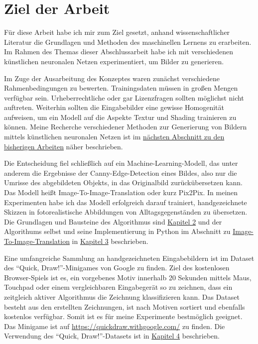 \section{Ziel der Arbeit}
\label{sec:ziel}
Für diese Arbeit habe ich mir zum Ziel gesetzt, anhand wissenschaftlicher Literatur die Grundlagen und Methoden des maschinellen Lernens zu erarbeiten. Im Rahmen des Themas dieser Abschlussarbeit habe ich mit verschiedenen künstlichen neuronalen Netzen experimentiert, um Bilder zu generieren.

Im Zuge der Ausarbeitung des Konzeptes waren zunächst verschiedene Rahmenbedingungen zu bewerten. Trainingsdaten müssen in großen Mengen verfügbar sein. Urheberrechtliche oder gar Lizenzfragen sollten möglichst nicht auftreten. Weiterhin sollten die Eingabebilder eine gewisse Homogenität aufweisen, um ein Modell auf die Aspekte Textur und Shading trainieren zu können. Meine Recherche verschiedener Methoden zur Generierung von Bildern mittels künstlichen neuronalen Netzen ist im \hyperref[sec:related]{nächsten Abschnitt zu den bisherigen Arbeiten} näher beschrieben.

Die Entscheidung fiel schließlich auf ein Machine-Learning-Modell, das unter anderem die Ergebnisse der Canny-Edge-Detection \cite{canny1986edge} eines Bildes, also nur die Umrisse des abgebildeten Objekts, in das Originalbild zurückübersetzen kann. Das Modell heißt Image-To-Image-Translation \cite{isola2018imagetoimage} oder kurz Pix2Pix. In meinen Experimenten habe ich das Modell erfolgreich darauf trainiert, handgezeichnete Skizzen in fotorealistische Abbildungen von Alltagsgegenständen zu übersetzen. Die Grundlagen und Bausteine des Algorithmus sind \hyperref[sec:model]{Kapitel 2} und der Algorithums selbst und seine Implementierung in Python im Abschnitt zu \hyperref[sec:pix2pix]{Image-To-Image-Translation} in \hyperref[ch:impl]{Kapitel 3} beschrieben.

Eine umfangreiche Sammlung an handgezeichneten Eingabebildern ist im Dataset des ``Quick, Draw!''-Minigames von Google zu finden. Ziel des kostenlosen Browser-Spiels ist es, ein vorgebenes Motiv innerhalb 20 Sekunden mittels Maus, Touchpad oder einem vergleichbaren Eingabegerät so zu zeichnen, dass ein zeitgleich aktiver Algorithmus die Zeichnung klassifizieren kann. Das Dataset besteht aus den erstellten Zeichnungen, ist nach Motiven sortiert und ebenfalls kostenlos verfügbar. Somit ist es für meine Experimente bestmöglich geeignet. Das Minigame ist auf \href{https://quickdraw.withgoogle.com/}{https://quickdraw.withgoogle.com/} zu finden. Die Verwendung des ``Quick, Draw!''-Datasets ist in \hyperref[ch:conduct]{Kapitel 4} beschrieben.

